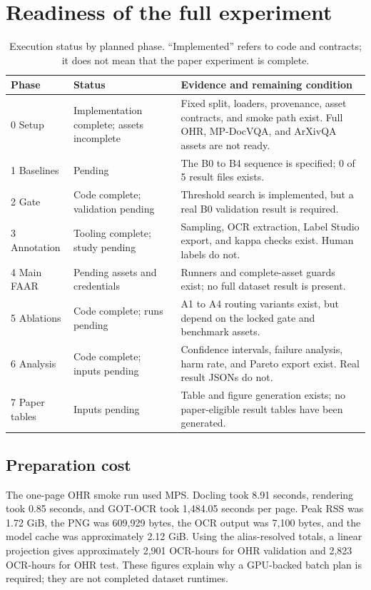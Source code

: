 \documentclass[10pt,twocolumn]{article}
\begin{document}
\section{Readiness of the full experiment}

\begin{table}[H]
\centering
\caption{Execution status by planned phase. ``Implemented'' refers to code and contracts; it does not mean that the paper experiment is complete.}
\label{tab:phases}
\scriptsize
\begin{tabularx}{\columnwidth}{@{}lL{0.25\columnwidth}Y@{}}
\toprule
Phase & Status & Evidence and remaining condition \\
 Setup & Implementation complete; assets incomplete & Fixed split, loaders, provenance, asset contracts, and smoke path exist. Full OHR, MP-DocVQA, and ArXivQA assets are not ready. \\
1 Baselines & Pending & The B0 to B4 sequence is specified; 0 of 5 result files exists. \\
2 Gate & Code complete; validation pending & Threshold search is implemented, but a real B0 validation result is required. \\
3 Annotation & Tooling complete; study pending & Sampling, OCR extraction, Label Studio export, and kappa checks exist. Human labels do not. \\
4 Main FAAR & Pending assets and credentials & Runners and complete-asset guards exist; no full dataset result is present. \\
5 Ablations & Code complete; runs pending & A1 to A4 routing variants exist, but depend on the locked gate and benchmark assets. \\
6 Analysis & Code complete; inputs pending & Confidence intervals, failure analysis, harm rate, and Pareto export exist. Real result JSONs do not. \\
7 Paper tables & Inputs pending & Table and figure generation exists; no paper-eligible result tables have been generated. \\
\bottomrule
\end{tabularx}
\end{table}

\subsection{Preparation cost}

The one-page OHR smoke run used MPS. Docling took 8.91 seconds, rendering took 0.85 seconds, and GOT-OCR took 1,484.05 seconds per page. Peak RSS was 1.72 GiB, the PNG was 609,929 bytes, the OCR output was 7,100 bytes, and the model cache was approximately 2.12 GiB. Using the alias-resolved totals, a linear projection gives approximately 2,901 OCR-hours for OHR validation and 2,823 OCR-hours for OHR test. These figures explain why a GPU-backed batch plan is required; they are not completed dataset runtimes.
\end{document}
